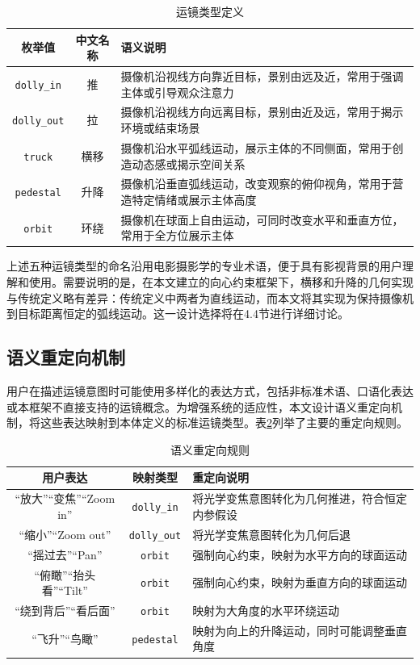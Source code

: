 \begin{table}[htbp]
\centering
\caption{运镜类型定义}
\label{tab:movement_type}
\begin{tabular}{ccp{8cm}}
\toprule
枚举值 & 中文名称 & 语义说明 \\
\midrule
\texttt{dolly\_in} & 推 & 摄像机沿视线方向靠近目标，景别由远及近，常用于强调主体或引导观众注意力 \\
\texttt{dolly\_out} & 拉 & 摄像机沿视线方向远离目标，景别由近及远，常用于揭示环境或结束场景 \\
\texttt{truck} & 横移 & 摄像机沿水平弧线运动，展示主体的不同侧面，常用于创造动态感或揭示空间关系 \\
\texttt{pedestal} & 升降 & 摄像机沿垂直弧线运动，改变观察的俯仰视角，常用于营造特定情绪或展示主体高度 \\
\texttt{orbit} & 环绕 & 摄像机在球面上自由运动，可同时改变水平和垂直方位，常用于全方位展示主体 \\
\bottomrule
\end{tabular}
\end{table}


上述五种运镜类型的命名沿用电影摄影学的专业术语\cite{arijon1976grammar,mascelli1965five}，便于具有影视背景的用户理解和使用。需要说明的是，在本文建立的向心约束框架下，横移和升降的几何实现与传统定义略有差异：传统定义中两者为直线运动，而本文将其实现为保持摄像机到目标距离恒定的弧线运动。这一设计选择将在4.4节进行详细讨论。

\subsection{语义重定向机制}

用户在描述运镜意图时可能使用多样化的表达方式，包括非标准术语、口语化表达或本框架不直接支持的运镜概念。为增强系统的适应性，本文设计语义重定向机制，将这些表达映射到本体定义的标准运镜类型。表\ref{tab:semantic_redirect}列举了主要的重定向规则。

\begin{table}[htbp]
\centering
\caption{语义重定向规则}
\label{tab:semantic_redirect}
\begin{tabular}{ccp{6cm}}
\toprule
用户表达 & 映射类型 & 重定向说明 \\
\midrule
“放大”“变焦”“Zoom in” & \texttt{dolly\_in} & 将光学变焦意图转化为几何推进，符合恒定内参假设 \\
“缩小”“Zoom out” & \texttt{dolly\_out} & 将光学变焦意图转化为几何后退 \\
“摇过去”“Pan” & \texttt{orbit} & 强制向心约束，映射为水平方向的球面运动 \\
“俯瞰”“抬头看”“Tilt” & \texttt{orbit} & 强制向心约束，映射为垂直方向的球面运动 \\
“绕到背后”“看后面” & \texttt{orbit} & 映射为大角度的水平环绕运动 \\
“飞升”“鸟瞰” & \texttt{pedestal} & 映射为向上的升降运动，同时可能调整垂直角度 \\
\bottomrule
\end{tabular}
\end{table}

